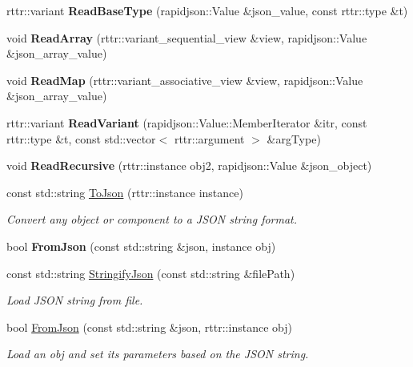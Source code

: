 \begin{DoxyCompactItemize}
\item 
\mbox{\label{namespaceCantReflect_a3eea443d6cb0e28710cb2b2bbbeafd21}} 
rttr\+::variant {\bfseries Read\+Base\+Type} (rapidjson\+::\+Value \&json\+\_\+value, const rttr\+::type \&t)
\item 
\mbox{\label{namespaceCantReflect_ae3d2846d87c6c6ee540ec247e2488f4a}} 
void {\bfseries Read\+Array} (rttr\+::variant\+\_\+sequential\+\_\+view \&view, rapidjson\+::\+Value \&json\+\_\+array\+\_\+value)
\item 
\mbox{\label{namespaceCantReflect_a187b1c9100c2a36f9cc594480b25f71c}} 
void {\bfseries Read\+Map} (rttr\+::variant\+\_\+associative\+\_\+view \&view, rapidjson\+::\+Value \&json\+\_\+array\+\_\+value)
\item 
\mbox{\label{namespaceCantReflect_a7e66d2c3107cef9534c1179b4d35040f}} 
rttr\+::variant {\bfseries Read\+Variant} (rapidjson\+::\+Value\+::\+Member\+Iterator \&itr, const rttr\+::type \&t, const std\+::vector$<$ rttr\+::argument $>$ \&arg\+Type)
\item 
\mbox{\label{namespaceCantReflect_a5f0227a7aa8820eb678bfba7d96178b9}} 
void {\bfseries Read\+Recursive} (rttr\+::instance obj2, rapidjson\+::\+Value \&json\+\_\+object)
\item 
const std\+::string \hyperlink{namespaceCantReflect_a88e14086a9520f73b48c09264bf48320}{To\+Json} (rttr\+::instance instance)
\begin{DoxyCompactList}\small\item\em Convert any object or component to a J\+S\+ON string format. \end{DoxyCompactList}\item 
\mbox{\label{namespaceCantReflect_a0d0bda4a4ed1b950d754ccd8544deec3}} 
bool {\bfseries From\+Json} (const std\+::string \&json, instance obj)
\item 
const std\+::string \hyperlink{namespaceCantReflect_a9503ff01819825b8309343e134fecf40}{Stringify\+Json} (const std\+::string \&file\+Path)
\begin{DoxyCompactList}\small\item\em Load J\+S\+ON string from file. \end{DoxyCompactList}\item 
bool \hyperlink{namespaceCantReflect_a9f92a2d70c4eee62a67e9931f75f36ab}{From\+Json} (const std\+::string \&json, rttr\+::instance obj)
\begin{DoxyCompactList}\small\item\em Load an obj and set its parameters based on the J\+S\+ON string. \end{DoxyCompactList}\end{DoxyCompactItemize}


